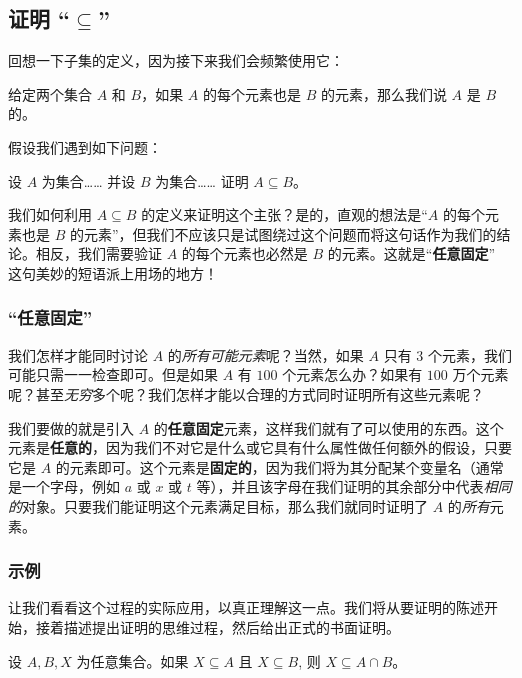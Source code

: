 \subsection{证明 ``$\subseteq$''}

回想一下子集的定义，因为接下来我们会频繁使用它：

\begin{definition}
    给定两个集合 $A$ 和 $B$，如果 $A$ 的每个元素也是 $B$ 的元素，那么我们说 $A$ 是 $B$ 的。
\end{definition}

假设我们遇到如下问题：
\begin{center}
    设 $A$ 为集合…… 并设 $B$ 为集合…… 证明 $A \subseteq B$。
\end{center}
我们如何利用 $A \subseteq B$ 的定义来证明这个主张？是的，直观的想法是``$A$ 的每个元素也是 $B$ 的元素''，但我们不应该只是试图绕过这个问题而将这句话作为我们的结论。相反，我们需要验证 $A$ 的每个元素也必然是 $B$ 的元素。这就是``\textbf{任意固定}'' 这句美妙的短语派上用场的地方！

\subsubsection*{``任意固定''}

我们怎样才能同时讨论 $A$ 的\emph{所有可能元素}呢？当然，如果 $A$ 只有 $3$ 个元素，我们可能只需一一检查即可。但是如果 $A$ 有 $100$ 个元素怎么办？如果有 $100$ 万个元素呢？甚至\emph{无穷}多个呢？我们怎样才能以合理的方式同时证明所有这些元素呢？

我们要做的就是引入 $A$ 的\textbf{任意固定}元素，这样我们就有了可以使用的东西。这个元素是\textbf{任意的}，因为我们不对它是什么或它具有什么属性做任何额外的假设，只要它是 $A$ 的元素即可。这个元素是\textbf{固定的}，因为我们将为其分配某个变量名（通常是一个字母，例如 $a$ 或 $x$ 或 $t$ 等），并且该字母在我们证明的其余部分中代表\emph{相同的}对象。只要我们能证明这个元素满足目标，那么我们就同时证明了 $A$ 的\emph{所有}元素。

\subsubsection*{示例}

让我们看看这个过程的实际应用，以真正理解这一点。我们将从要证明的陈述开始，接着描述提出证明的思维过程，然后给出正式的书面证明。

\begin{lemma}\label{lemma3.9.1}
    设 $A,B,X$ 为任意集合。如果 $X \subseteq A$ 且 $X \subseteq B$, 则 $X \subseteq A \cap B$。
\end{lemma}

